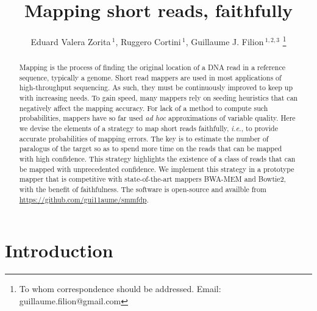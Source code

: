\documentclass[a4,center,fleqn]{NAR}
\begin{document}
\title{Mapping short reads, faithfully}

\author{%
Eduard Valera Zorita\,$^1$,
Ruggero Cortini\,$^1$,
Guillaume J. Filion\,$^{1,2,3}$
\footnote{To whom correspondence should be addressed.
Email: guillaume.filion@gmail.com}}

\address{%
$^{1}$Center for Genomic Regulation (CRG), The Barcelona Institute
of Science and Technology, Dr. Aiguader 88, Barcelona 08003, Spain;
$^{2}$University Pompeu Fabra (UPF), Barcelona, Spain;
$^{3}$present address: Department of Biological Sciences, University
of Toronto Scarborough, Toronto, ON, Canada.}


\maketitle

\begin{abstract}
Mapping is the process of finding the original location of a DNA read in a
reference sequence, typically a genome. Short read mappers are used in
most applications of high-throughput sequencing. As such, they must be
continuously improved to keep up with increasing needs. To gain speed,
many mappers rely on seeding heuristics that can negatively affect the
mapping accuracy. For lack of a method to compute such probabilities,
mappers have so far used \textit{ad hoc} approximations of variable
quality. Here we devise the elements of a strategy to map short reads
faithfully, \textit{i.e.}, to provide accurate probabilities of mapping
errors. The key is to estimate the number of paralogus of the target so as
to spend more time on the reads that can be mapped with high confidence.
This strategy highlights the existence of a class of reads that can be
mapped with unprecedented confidence. We implement this strategy in a
prototype mapper that is competitive with state-of-the-art mappers BWA-MEM
and Bowtie2, with the benefit of faithfulness. The software is open-source
and availble from \url{https://github.com/gui11aume/smmfdp}.
\end{abstract}


\section{Introduction}
\end{document}
